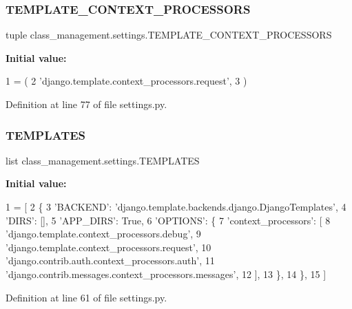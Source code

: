 \subsubsection{\texorpdfstring{T\+E\+M\+P\+L\+A\+T\+E\+\_\+\+C\+O\+N\+T\+E\+X\+T\+\_\+\+P\+R\+O\+C\+E\+S\+S\+O\+RS}{TEMPLATE\_CONTEXT\_PROCESSORS}}
{\footnotesize\ttfamily tuple class\+\_\+management.\+settings.\+T\+E\+M\+P\+L\+A\+T\+E\+\_\+\+C\+O\+N\+T\+E\+X\+T\+\_\+\+P\+R\+O\+C\+E\+S\+S\+O\+RS}

{\bfseries Initial value\+:}
\begin{DoxyCode}
1 =  (
2     \textcolor{stringliteral}{'django.template.context\_processors.request'},
3 )
\end{DoxyCode}


Definition at line 77 of file settings.\+py.

\hypertarget{namespaceclass__management_1_1settings_ae651e735f9dad93423cd409ad917b9e8}{}\label{namespaceclass__management_1_1settings_ae651e735f9dad93423cd409ad917b9e8} 
\subsubsection{\texorpdfstring{T\+E\+M\+P\+L\+A\+T\+ES}{TEMPLATES}}
{\footnotesize\ttfamily list class\+\_\+management.\+settings.\+T\+E\+M\+P\+L\+A\+T\+ES}

{\bfseries Initial value\+:}
\begin{DoxyCode}
1 =  [
2     \{
3         \textcolor{stringliteral}{'BACKEND'}: \textcolor{stringliteral}{'django.template.backends.django.DjangoTemplates'},
4         \textcolor{stringliteral}{'DIRS'}: [],
5         \textcolor{stringliteral}{'APP\_DIRS'}: \textcolor{keyword}{True},
6         \textcolor{stringliteral}{'OPTIONS'}: \{
7             \textcolor{stringliteral}{'context\_processors'}: [
8                 \textcolor{stringliteral}{'django.template.context\_processors.debug'},
9                 \textcolor{stringliteral}{'django.template.context\_processors.request'},
10                 \textcolor{stringliteral}{'django.contrib.auth.context\_processors.auth'},
11                 \textcolor{stringliteral}{'django.contrib.messages.context\_processors.messages'},
12             ],
13         \},
14     \},
15 ]
\end{DoxyCode}


Definition at line 61 of file settings.\+py.

